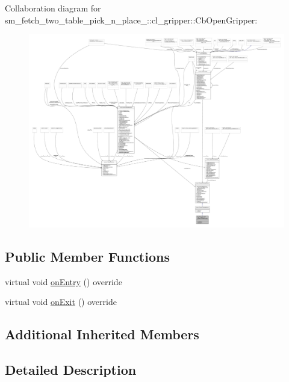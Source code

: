 Collaboration diagram for sm\+\_\+fetch\+\_\+two\+\_\+table\+\_\+pick\+\_\+n\+\_\+place\+\_\+:\+:cl\+\_\+gripper\+:\+:Cb\+Open\+Gripper\+:
\nopagebreak
\begin{figure}[H]
\begin{center}
\leavevmode
\includegraphics[width=350pt]{classsm__fetch__two__table__pick__n__place__1_1_1cl__gripper_1_1CbOpenGripper__coll__graph}
\end{center}
\end{figure}
\subsection*{Public Member Functions}
\begin{DoxyCompactItemize}
\item 
virtual void \hyperlink{classsm__fetch__two__table__pick__n__place__1_1_1cl__gripper_1_1CbOpenGripper_a08f95a8f05e33c1a04b77fa5f3465d78}{on\+Entry} () override
\item 
virtual void \hyperlink{classsm__fetch__two__table__pick__n__place__1_1_1cl__gripper_1_1CbOpenGripper_aa5943cc677a643e9e7cd5d57766857fc}{on\+Exit} () override
\end{DoxyCompactItemize}
\subsection*{Additional Inherited Members}


\subsection{Detailed Description}


